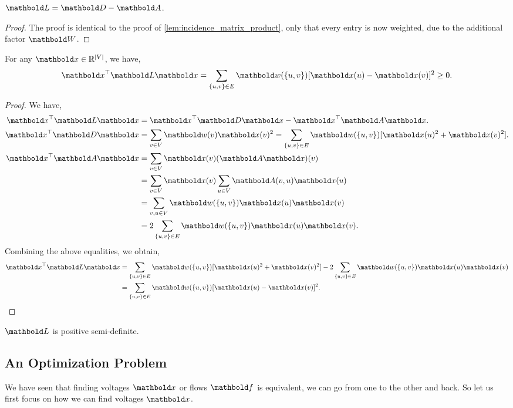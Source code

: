 \begin{lem}
$\mL = \mD - \mA$.
\end{lem}
\begin{proof}
The proof is identical to the proof of \cref{lem:incidence_matrix_product}, only that every entry is now weighted, due to the additional factor $\mW$.
\end{proof}

\begin{lem}
For any $\vx \in \R^{|\sV|}$, we have, \begin{align}
    \trans{\vx}\mL\vx = \sum_{\{u,v\}\in\sE} \vw(\{u, v\})[\vx(u) - \vx(v)]^2 \geq 0.
\end{align}
\end{lem}
\begin{proof}
We have, \begin{align*}
    \trans{\vx}\mL\vx &= \trans{\vx}\mD\vx - \trans{\vx}\mA\vx. \\
    \trans{\vx}\mD\vx &= \sum_{v \in \sV} \vw(v) \vx(v)^2 = \sum_{\{u,v\}\in\sE} \vw(\{u,v\})[\vx(u)^2 + \vx(v)^2]. \\
    \trans{\vx}\mA\vx &= \sum_{v \in \sV} \vx(v) (\mA\vx)(v) \\
    &= \sum_{v \in \sV} \vx(v) \sum_{u \in \sV} \mA(v,u) \vx(u) \\
    &= \sum_{v,u \in \sV} \vw(\{u,v\})\vx(u)\vx(v) \\
    &= 2 \sum_{\{u,v\}\in\sE} \vw(\{u,v\})\vx(u)\vx(v).
\end{align*} Combining the above equalities, we obtain, \begin{align*}
    \trans{\vx}\mL\vx &= \sum_{\{u,v\}\in\sE} \vw(\{u,v\})[\vx(u)^2 + \vx(v)^2] - 2 \sum_{\{u,v\}\in\sE} \vw(\{u,v\})\vx(u)\vx(v) \\
    &= \sum_{\{u,v\}\in\sE} \vw(\{u,v\})[\vx(u) - \vx(v)]^2. \qedhere
\end{align*}
\end{proof}
\begin{cor}
$\mL$ is positive semi-definite.
\end{cor}

\subsection{An Optimization Problem}

We have seen that finding voltages $\vx$ or flows $\vf$ is equivalent, we can go from one to the other and back. So let us first focus on how we can find voltages $\vx$.

